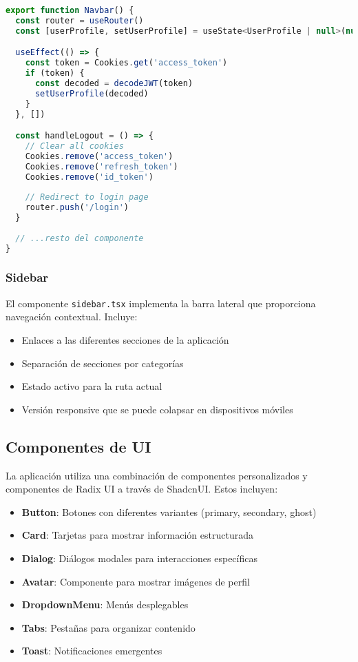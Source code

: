\documentclass[12pt,a4paper]{report}
\begin{document}
\begin{lstlisting}[language=JavaScript, caption=Estructura del componente Navbar]
export function Navbar() {
  const router = useRouter()
  const [userProfile, setUserProfile] = useState<UserProfile | null>(null)

  useEffect(() => {
    const token = Cookies.get('access_token')
    if (token) {
      const decoded = decodeJWT(token)
      setUserProfile(decoded)
    }
  }, [])

  const handleLogout = () => {
    // Clear all cookies
    Cookies.remove('access_token')
    Cookies.remove('refresh_token')
    Cookies.remove('id_token')
    
    // Redirect to login page
    router.push('/login')
  }
  
  // ...resto del componente
}
\end{lstlisting}

\subsubsection{Sidebar}
El componente \texttt{sidebar.tsx} implementa la barra lateral que proporciona navegación contextual. Incluye:

\begin{itemize}
    \item Enlaces a las diferentes secciones de la aplicación
    \item Separación de secciones por categorías
    \item Estado activo para la ruta actual
    \item Versión responsive que se puede colapsar en dispositivos móviles
\end{itemize}

\subsection{Componentes de UI}
La aplicación utiliza una combinación de componentes personalizados y componentes de Radix UI a través de ShadcnUI. Estos incluyen:

\begin{itemize}
    \item \textbf{Button}: Botones con diferentes variantes (primary, secondary, ghost)
    \item \textbf{Card}: Tarjetas para mostrar información estructurada
    \item \textbf{Dialog}: Diálogos modales para interacciones específicas
    \item \textbf{Avatar}: Componente para mostrar imágenes de perfil
    \item \textbf{DropdownMenu}: Menús desplegables
    \item \textbf{Tabs}: Pestañas para organizar contenido
    \item \textbf{Toast}: Notificaciones emergentes
\end{itemize}
\end{document}
